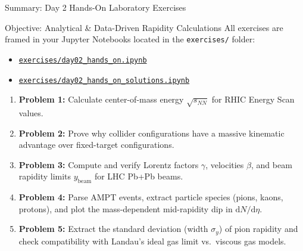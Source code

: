 \documentclass[aspectratio=169]{beamer}
\begin{document}
\begin{frame}{Summary: Day 2 Hands-On Laboratory Exercises}
    \begin{block}{Objective: Analytical \& Data-Driven Rapidity Calculations}
        \small
        All exercises are framed in your Jupyter Notebooks located in the \texttt{exercises/} folder:
        \begin{itemize}
            \item \href{run:exercises/day02_hands_on.ipynb}{\texttt{exercises/day02\_hands\_on.ipynb}} 
            \item \href{run:exercises/day02_hands_on_solutions.ipynb}{\texttt{exercises/day02\_hands\_on\_solutions.ipynb}} 
        \end{itemize}
    \end{block}
    \begin{enumerate}
        \footnotesize
        \item \textbf{Problem 1:} Calculate center-of-mass energy $\sqrt{s_{NN}}$ for RHIC Energy Scan values.
        \item \textbf{Problem 2:} Prove why collider configurations have a massive kinematic advantage over fixed-target configurations.
        \item \textbf{Problem 3:} Compute and verify Lorentz factors $\gamma$, velocities $\beta$, and beam rapidity limits $y_{\mathrm{beam}}$ for LHC Pb+Pb beams.
        \item \textbf{Problem 4:} Parse AMPT events, extract particle species (pions, kaons, protons), and plot the mass-dependent mid-rapidity dip in $\mathrm{d}N/\mathrm{d}\eta$.
        \item \textbf{Problem 5:} Extract the standard deviation (width $\sigma_y$) of pion rapidity and check compatibility with Landau's ideal gas limit vs.\ viscous gas models.
    \end{enumerate}
\end{frame}
\end{document}
